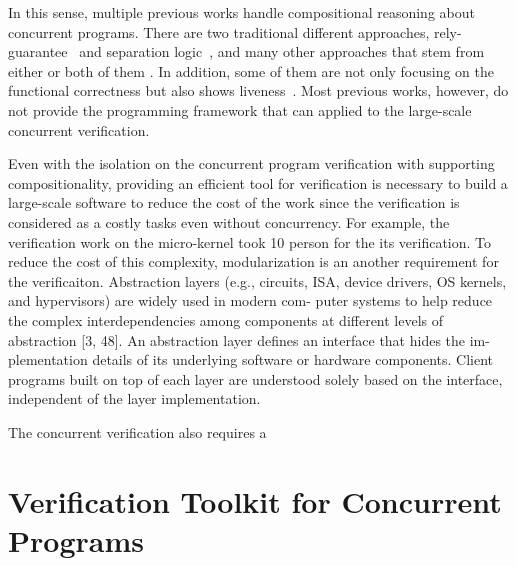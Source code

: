 In this sense, 
multiple previous works handle compositional reasoning about concurrent programs.
There are two traditional different approaches,
rely-guarantee~ and separation logic~,
and many other approaches that stem from either or both of them
.
In addition, some of them are not only focusing on the functional correctness but also 
shows liveness~. 
Most previous works, however, do not provide the programming framework 
that can applied to the large-scale concurrent verification. 



Even with the isolation on the concurrent program verification with supporting 
compositionality, 
providing an efficient tool for verification is necessary to build a large-scale software
to reduce the cost of the work
since the verification is considered as a costly tasks 
even without concurrency.
For example, the verification work on the micro-kernel
took 10 person for the its verification. 
To reduce the cost of this complexity, 
modularization is an another requirement for the verificaiton. 
Abstraction layers (e.g., circuits, ISA, device drivers, OS kernels, and hypervisors) are widely used in modern com- puter systems to help reduce the complex interdependencies among components at different levels of abstraction [3, 48]. 
An abstraction layer defines an interface that hides the im- plementation details of its underlying software or hardware components. Client programs built on top of each layer are understood solely based on the interface, independent of the layer implementation.

The concurrent verification also requires a 



\section{Verification Toolkit for Concurrent Programs}
\label{chapter:introduction:sec:verification-toolkit-for-concurrent-programs}

